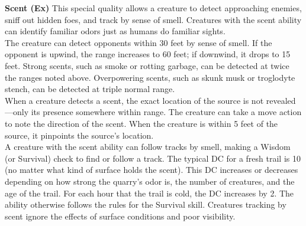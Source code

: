\textbf{Scent (Ex)} This special quality allows a creature to detect approaching enemies, sniff out hidden foes, and track by sense of smell. Creatures with the scent ability can identify familiar odors just as humans do familiar sights. \\

The creature can detect opponents within 30 feet by sense of smell. If the opponent is upwind, the range increases to 60 feet; if downwind, it drops to 15 feet. Strong scents, such as smoke or rotting garbage, can be detected at twice the ranges noted above. Overpowering scents, such as skunk musk or troglodyte stench, can be detected at triple normal range. \\

When a creature detects a scent, the exact location of the source is not revealed—only its presence somewhere within range. The creature can take a move action to note the direction of the scent. When the creature is within 5 feet of the source, it pinpoints the source's location. \\

A creature with the scent ability can follow tracks by smell, making a Wisdom (or Survival) check to find or follow a track. The typical DC for a fresh trail is 10 (no matter what kind of surface holds the scent). This DC increases or decreases depending on how strong the quarry's odor is, the number of creatures, and the age of the trail. For each hour that the trail is cold, the DC increases by 2. The ability otherwise follows the rules for the Survival skill. Creatures tracking by scent ignore the effects of surface conditions and poor visibility. \\

\newpage
